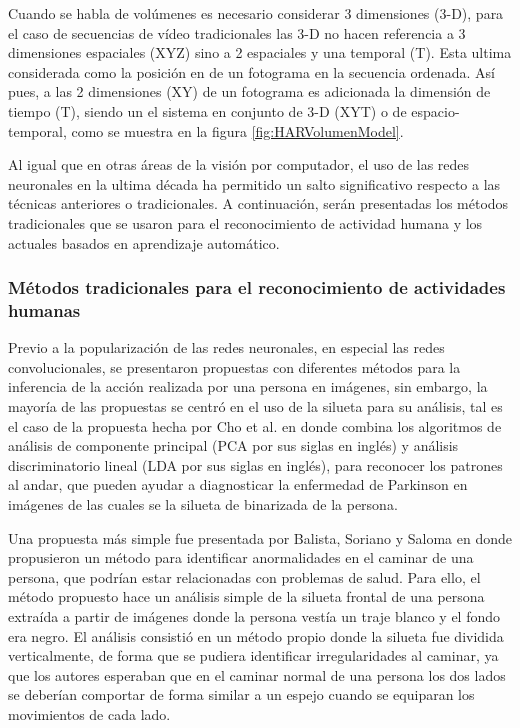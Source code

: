 \begin{itemize}
                Cuando se habla de volúmenes es necesario considerar 3 dimensiones (3-D), para el caso de secuencias de vídeo tradicionales las 3-D no hacen referencia a 3 dimensiones espaciales (XYZ) sino a 2 espaciales y una temporal (T). Esta ultima considerada como la posición en de un fotograma en la secuencia ordenada. Así pues, a las 2 dimensiones (XY) de un fotograma es adicionada la dimensión de tiempo (T), siendo un el sistema en conjunto de 3-D (XYT) o de espacio-temporal, como se muestra en la figura \ref{fig:HARVolumenModel}.
        
            \end{itemize}

        Al igual que en otras áreas de la visión por computador, el uso de las redes neuronales en la ultima década ha permitido un salto significativo respecto a las técnicas anteriores o tradicionales. A continuación, serán presentadas los métodos tradicionales que se usaron para el reconocimiento de actividad humana y los actuales basados en aprendizaje automático.
        
        \subsubsection{Métodos tradicionales para el reconocimiento de actividades humanas}
        \label{Sub2:FrameHARTraditional}
        
        Previo a la popularización de las redes neuronales, en especial las redes convolucionales, se presentaron propuestas con diferentes métodos para la inferencia de la acción realizada por una persona en imágenes, sin embargo, la mayoría de las propuestas se centró en el uso de la silueta para su análisis, tal es el caso de la propuesta hecha por Cho et al. en \cite{Cho2009Parkinson} donde combina los algoritmos de análisis de componente principal (PCA por sus siglas en inglés) y análisis discriminatorio lineal (LDA por sus siglas en inglés), para reconocer los patrones al andar, que pueden ayudar a diagnosticar la enfermedad de Parkinson en imágenes de las cuales se la silueta de binarizada de la persona.
        
        Una propuesta más simple fue presentada por Balista, Soriano y Saloma en \cite{Balista2010} donde propusieron un método para identificar anormalidades en el caminar de una persona, que podrían estar relacionadas con problemas de salud. Para ello, el método propuesto hace un análisis simple de la silueta frontal de una persona extraída a partir de imágenes donde la persona vestía un traje blanco y el fondo era negro. El análisis consistió en un método propio donde la silueta fue dividida verticalmente, de forma que se pudiera identificar irregularidades al caminar, ya que los autores esperaban que en el caminar normal de una persona los dos lados se deberían comportar de forma similar a un espejo cuando se equiparan los movimientos de cada lado.
        
